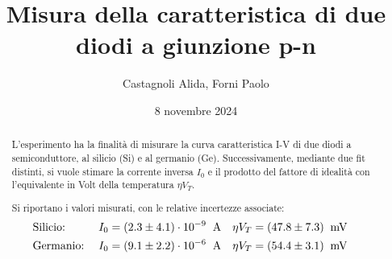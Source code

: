 \documentclass[11pt]{article}
\begin{document}

    \title{\textbf{Misura della caratteristica di due diodi a giunzione p-n}}
    \author{Castagnoli Alida, Forni Paolo}
    \date{8 novembre 2024}
    \maketitle


    \vspace{-23pt}  %

    \begin{abstract}
        L'esperimento ha la finalità di misurare la curva caratteristica \mbox{I-V} di due diodi a semiconduttore,
        al silicio (Si) e al germanio (Ge).
        Successivamente, mediante due fit distinti, si vuole stimare la corrente inversa $I_{0}$ e il prodotto del
        fattore di idealità con l'equivalente in Volt della temperatura $\eta V_{T}$.

        \noindent Si riportano i valori misurati, con le relative incertezze associate:
        \vspace{-1pt}
        \begin{align*}
            &\textnormal{Silicio:} \;
            &I_{0} &= (2.3 \pm 4.1)\cdot 10^{-9} \;\;\textnormal{A} &
            \eta V_{T} &= (47.8 \pm 7.3)\;\;\textnormal{mV} & \\
            &\textnormal{Germanio:} \;
            &I_{0} &= (9.1 \pm 2.2) \cdot 10^{-6} \;\;\textnormal{A} &
            \eta V_{T} &= (54.4 \pm 3.1)\;\;\textnormal{mV} &
        \end{align*}

    \end{abstract}
    
    
    
    
    \newpage
    \appendix

    
\end{document}
